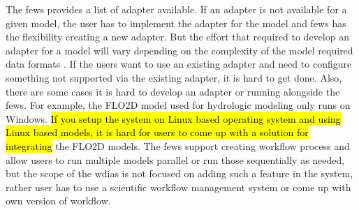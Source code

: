 The \acrshort{fews} provides a list of adapter available. If an adapter is not available for a given model, the user has to implement the adapter for the model and \acrshort{fews} has the flexibility creating a new adapter. But the effort that required to develop an adapter for a model will vary depending on the complexity of the model required data formats \cite{Werner2013TheSystem}. If the users want to use an existing adapter and need to configure something not supported via the existing adapter, it is hard to get done. Also, there are some cases it is hard to develop an adapter or running alongside the \acrshort{fews}. For example, the FLO2D model used for hydrologic modeling only runs on Windows.\hl{ If you setup the system on Linux based operating system and using Linux based models, it is hard for users to come up with a solution for integrating} the FLO2D models.
The \acrshort{fews} support creating workflow process and allow users to run multiple models parallel or run those sequentially as needed, but the scope of the \acrshort{wdias} is not focused on adding such a feature in the system, rather user has to use a scientific workflow management system or come up with own version of workflow.
